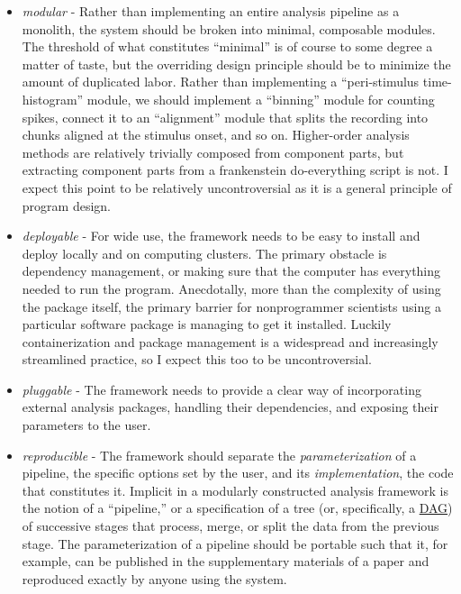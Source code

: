 \documentclass[10pt]{article}
\begin{document}
\begin{multicols}{2}
\begin{itemize}
\item
  \emph{modular} - Rather than implementing an entire analysis pipeline
  as a monolith, the system should be broken into minimal, composable
  modules. The threshold of what constitutes ``minimal'' is of course to
  some degree a matter of taste, but the overriding design principle
  should be to minimize the amount of duplicated labor. Rather than
  implementing a ``peri-stimulus time-histogram'' module, we should
  implement a ``binning'' module for counting spikes, connect it to an
  ``alignment'' module that splits the recording into chunks aligned at
  the stimulus onset, and so on. Higher-order analysis methods are
  relatively trivially composed from component parts, but extracting
  component parts from a frankenstein do-everything script is not. I
  expect this point to be relatively uncontroversial as it is a general
  principle of program design.
\item
  \emph{deployable} - For wide use, the framework needs to be easy to
  install and deploy locally and on computing clusters. The primary
  obstacle is dependency management, or making sure that the computer
  has everything needed to run the program. Anecdotally, more than the
  complexity of using the package itself, the primary barrier for
  nonprogrammer scientists using a particular software package is
  managing to get it installed. Luckily containerization and package
  management is a widespread and increasingly streamlined practice, so I
  expect this too to be uncontroversial.
\item
  \emph{pluggable} - The framework needs to provide a clear way of
  incorporating external analysis packages, handling their dependencies,
  and exposing their parameters to the user.
\item
  \emph{reproducible} - The framework should separate the
  \emph{parameterization} of a pipeline, the specific options set by the
  user, and its \emph{implementation}, the code that constitutes it.
  Implicit in a modularly constructed analysis framework is the notion
  of a ``pipeline,'' or a specification of a tree (or, specifically, a
  \href{https://en.wikipedia.org/wiki/Directed_acyclic_graph}{DAG}) of
  successive stages that process, merge, or split the data from the
  previous stage. The parameterization of a pipeline should be portable
  such that it, for example, can be published in the supplementary
  materials of a paper and reproduced exactly by anyone using the
  system.
\end{itemize}


\end{multicols}
\end{document}
